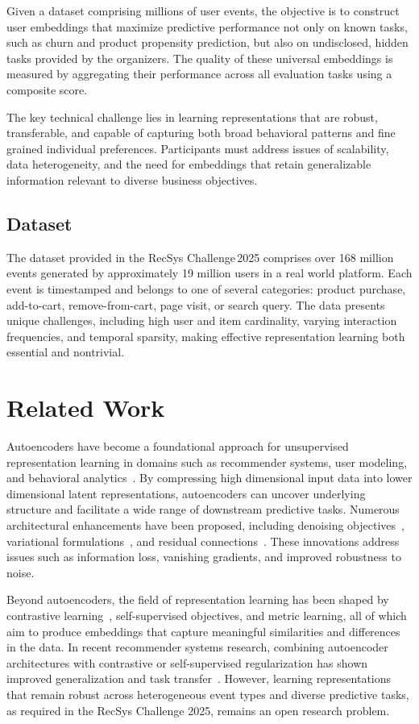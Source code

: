 \documentclass[sigconf]{acmart}
\begin{document}
Given a dataset comprising millions of user events, the objective is to construct user embeddings that maximize predictive performance not only on known tasks, such as churn and product propensity prediction, but also on undisclosed, hidden tasks provided by the organizers. The quality of these universal embeddings is measured by aggregating their performance across all evaluation tasks using a composite score.

The key technical challenge lies in learning representations that are robust, transferable, and capable of capturing both broad behavioral patterns and fine grained individual preferences. Participants must address issues of scalability, data heterogeneity, and the need for embeddings that retain generalizable information relevant to diverse business objectives.
\subsection{Dataset}
The dataset provided in the RecSys Challenge 2025 comprises over 168 million events generated by approximately 19 million users in a real world platform. Each event is timestamped and belongs to one of several categories: product purchase, add-to-cart, remove-from-cart, page visit, or search query. The data presents unique challenges, including high user and item cardinality, varying interaction frequencies, and temporal sparsity, making effective representation learning both essential and nontrivial.

\label{sec:related}
\section{Related Work}

Autoencoders have become a foundational approach for unsupervised representation learning in domains such as recommender systems, user modeling, and behavioral analytics~\cite{Hinton2006, Vincent2008, Kingma2014, Sedhain2015}. By compressing high dimensional input data into lower dimensional latent representations, autoencoders can uncover underlying structure and facilitate a wide range of downstream predictive tasks. Numerous architectural enhancements have been proposed, including denoising objectives~\cite{Vincent2008}, variational formulations~\cite{Kingma2014}, and residual connections~\cite{He2016ResNet, Mao2016}. These innovations address issues such as information loss, vanishing gradients, and improved robustness to noise.

Beyond autoencoders, the field of representation learning has been shaped by contrastive learning~\cite{Oord2018, Chen2020SimCLR}, self-supervised objectives, and metric learning, all of which aim to produce embeddings that capture meaningful similarities and differences in the data. In recent recommender systems research, combining autoencoder architectures with contrastive or self-supervised regularization has shown improved generalization and task transfer~\cite{Zhou2020S3Rec, Zhan2022CLAES}. However, learning representations that remain robust across heterogeneous event types and diverse predictive tasks, as required in the RecSys Challenge 2025, remains an open research problem.
\end{document}
